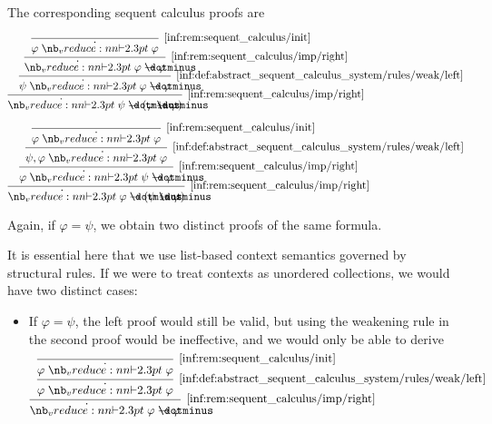 \begin{example}
  The corresponding sequent calculus proofs are
  \begin{paracol}{2}
    \begin{leftcolumn}
      \ParacolAlignmentHack
      \begin{equation*}
        \begin{prooftree}
          \infer0[\ref{inf:rem:sequent_calculus/init}]{ \varphi \synvdash \varphi }
          \infer1[\ref{inf:rem:sequent_calculus/imp/right}]{ \synvdash \varphi \synimplies \varphi }
          \infer1[\ref{inf:def:abstract_sequent_calculus_system/rules/weak/left}]{ \psi \synvdash \varphi \synimplies \varphi }
          \infer1[\ref{inf:rem:sequent_calculus/imp/right}]{ \synvdash \psi \synimplies (\varphi \synimplies \varphi) }
        \end{prooftree}
      \end{equation*}
    \end{leftcolumn}

    \begin{rightcolumn}
      \ParacolAlignmentHack
      \begin{equation*}
        \begin{prooftree}
          \infer0[\ref{inf:rem:sequent_calculus/init}]{ \varphi \synvdash \varphi }
          \infer1[\ref{inf:def:abstract_sequent_calculus_system/rules/weak/left}]{ \psi, \varphi \synvdash \varphi }
          \infer1[\ref{inf:rem:sequent_calculus/imp/right}]{ \varphi \synvdash \psi \synimplies \varphi }
          \infer1[\ref{inf:rem:sequent_calculus/imp/right}]{ \synvdash \varphi \synimplies (\psi \synimplies \varphi) }
        \end{prooftree}
      \end{equation*}
    \end{rightcolumn}
  \end{paracol}

  Again, if \( \varphi = \psi \), we obtain two distinct proofs of the same formula.

  It is essential here that we use list-based context semantics governed by structural rules. If we were to treat contexts as unordered collections, we would have two distinct cases:
  \begin{itemize}
    \item If \( \varphi = \psi \), the left proof would still be valid, but using the weakening rule in the second proof would be ineffective, and we would only be able to derive
    \begin{equation*}
      \begin{prooftree}
        \infer0[\ref{inf:rem:sequent_calculus/init}]{ \varphi \synvdash \varphi }
        \infer1[\ref{inf:def:abstract_sequent_calculus_system/rules/weak/left}]{ \varphi \synvdash \varphi }
        \infer1[\ref{inf:rem:sequent_calculus/imp/right}]{ \synvdash \varphi \synimplies \varphi }
      \end{prooftree}
    \end{equation*}


\end{itemize}
\end{example}
